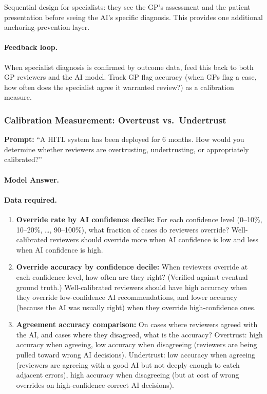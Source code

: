 Sequential design for specialists: they see the GP's assessment and the patient presentation before seeing the AI's specific diagnosis. This provides one additional anchoring-prevention layer.

\paragraph{Feedback loop.}

When specialist diagnosis is confirmed by outcome data, feed this back to both GP reviewers and the AI model. Track GP flag accuracy (when GPs flag a case, how often does the specialist agree it warranted review?) as a calibration measure.

\subsubsection{Calibration Measurement: Overtrust vs.\ Undertrust}

\textbf{Prompt:} ``A HITL system has been deployed for 6 months. How would you determine whether reviewers are overtrusting, undertrusting, or appropriately calibrated?''

\paragraph{Model Answer.}

\paragraph{Data required.}

\begin{enumerate}
    \item \textbf{Override rate by AI confidence decile:} For each confidence level (0--10\%, 10--20\%, \ldots, 90--100\%), what fraction of cases do reviewers override? Well-calibrated reviewers should override more when AI confidence is low and less when AI confidence is high.

    \item \textbf{Override accuracy by confidence decile:} When reviewers override at each confidence level, how often are they right? (Verified against eventual ground truth.) Well-calibrated reviewers should have high accuracy when they override low-confidence AI recommendations, and lower accuracy (because the AI was usually right) when they override high-confidence ones.

    \item \textbf{Agreement accuracy comparison:} On cases where reviewers agreed with the AI, and cases where they disagreed, what is the accuracy? Overtrust: high accuracy when agreeing, low accuracy when disagreeing (reviewers are being pulled toward wrong AI decisions). Undertrust: low accuracy when agreeing (reviewers are agreeing with a good AI but not deeply enough to catch adjacent errors), high accuracy when disagreeing (but at cost of wrong overrides on high-confidence correct AI decisions).
\end{enumerate}

